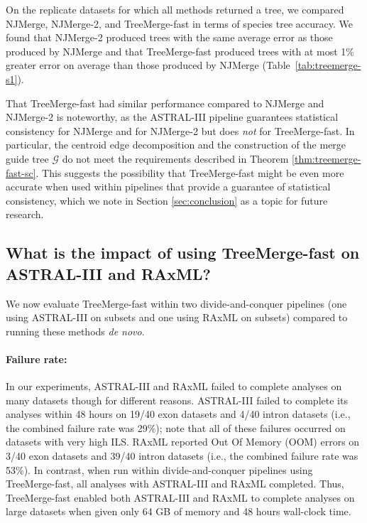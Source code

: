 On the replicate datasets for which all methods returned a tree, we compared NJMerge, NJMerge-2, and TreeMerge-fast in terms of species tree accuracy.
We found that NJMerge-2 produced trees with the same average error as those produced by NJMerge and that TreeMerge-fast produced trees with at most 1\% greater error on average than those produced by NJMerge (Table~\ref{tab:treemerge-s1}).

That TreeMerge-fast had similar performance compared to NJMerge and NJMerge-2 is noteworthy, as the ASTRAL-III pipeline guarantees statistical consistency for NJMerge and for NJMerge-2 but does {\em not} for TreeMerge-fast.
In particular, the centroid edge decomposition and the construction of the merge guide tree $\mathcal{G}$ do not meet the requirements described in Theorem \ref{thm:treemerge-fast-sc}.
This suggests the possibility that TreeMerge-fast might be even more accurate when used within pipelines that provide a guarantee of statistical consistency, which we note in Section \ref{sec:conclusion} as a topic for future research.

\subsection{What is the impact of using TreeMerge-fast on ASTRAL-III and RAxML?}
We now evaluate TreeMerge-fast within two divide-and-conquer pipelines (one using ASTRAL-III on subsets and one using RAxML on subsets) compared to running these methods {\em de novo}.

\paragraph{Failure rate:} 
In our experiments, ASTRAL-III and RAxML failed to complete analyses on many datasets though for different reasons.
ASTRAL-III failed to complete its analyses within 48 hours on 19/40 exon datasets and 4/40 intron datasets (i.e., the combined failure rate was 29\%); note that all of these failures occurred on datasets with very high ILS.
RAxML reported Out Of Memory (OOM) errors on 3/40 exon datasets and 39/40 intron datasets (i.e., the combined failure rate was 53\%).
In contrast, when run within divide-and-conquer pipelines using TreeMerge-fast, all analyses with ASTRAL-III and RAxML completed.
Thus, TreeMerge-fast enabled both ASTRAL-III and RAxML to complete analyses on large datasets when given only 64 GB of memory and 48 hours wall-clock time. 

